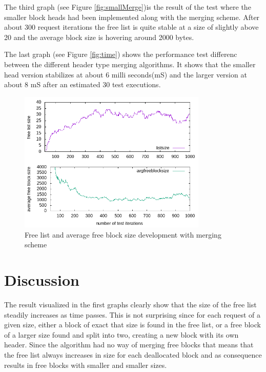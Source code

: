 \documentclass{article}
\begin{document}
The third graph (see Figure \ref{fig:smallMerge})is the result of the test where the smaller block heads had been implemented along with the merging 
scheme. After about 300 request iterations the free list is quite stable at a size of
 slightly above 20 and the average block size is hovering around 2000 bytes. 

The last graph (see Figure \ref{fig:time}) shows the performance test differenc between the different header type merging algorithms. It shows that 
the smaller head version stabilizes at about 6 milli seconds(mS) and the larger version at about 8 mS after an estimated 30 test executions.

\begin{figure}[h!]
    \centering
    \includegraphics[width=0.8\textwidth]{merge.png}
    \caption{Free list and average free block size development with merging scheme}
    \label{fig:merge}
\end{figure}



\section{Discussion}\label{discussion}

The result visualized in the first graphs clearly show that the size of the free list steadily increases as time
 passes. This is not surprising since for each request of a given size, either a block of exact that size is found in the free list, 
 or a free block of a larger size found and split into two, creating a new block with its own header. Since the algorithm had no way 
 of merging free blocks that means that the free list always increases in size for each deallocated block and as consequence results 
 in free blocks with smaller and smaller sizes.
\end{document}
